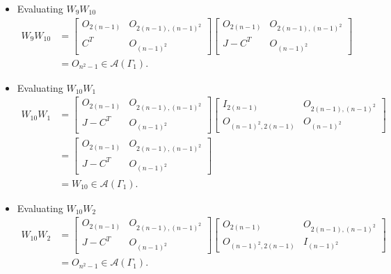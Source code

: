 \begin{itemize}
    \item Evaluating $W_9W_{10}$
    \begin{align*}
        W_9W_{10}
        &=\begin{bmatrix}
            O_{2(n-1)} & O_{2(n-1), (n-1)^2} \\
            C^T & O_{(n-1)^2}
        \end{bmatrix}\begin{bmatrix}
            O_{2(n-1)} & O_{2(n-1), (n-1)^2} \\
            J-C^T & O_{(n-1)^2}
        \end{bmatrix} \\
        &= O_{n^2-1}\in\mathcal{A}(\Gamma_1).
    \end{align*}
    
    \item Evaluating $W_{10}W_1$
    \begin{align*}
        W_{10}W_1
        &=\begin{bmatrix}
            O_{2(n-1)} & O_{2(n-1), (n-1)^2} \\
            J-C^T & O_{(n-1)^2}
        \end{bmatrix}\begin{bmatrix}
            I_{2(n-1)} & O_{2(n-1), (n-1)^2} \\
            O_{(n-1)^2, 2(n-1)} & O_{(n-1)^2}
        \end{bmatrix}\\
        &= \begin{bmatrix}
            O_{2(n-1)} & O_{2(n-1), (n-1)^2} \\
            J-C^T & O_{(n-1)^2}
        \end{bmatrix}\\
        &= W_{10}\in\mathcal{A}(\Gamma_1).
    \end{align*}
    
    \item Evaluating $W_{10}W_2$
    \begin{align*}
        W_{10}W_2
        &=\begin{bmatrix}
            O_{2(n-1)} & O_{2(n-1), (n-1)^2} \\
            J-C^T & O_{(n-1)^2}
        \end{bmatrix}\begin{bmatrix}
            O_{2(n-1)} & O_{2(n-1), (n-1)^2} \\
            O_{(n-1)^2, 2(n-1)} & I_{(n-1)^2}
        \end{bmatrix}\\
        &= O_{n^2-1}\in\mathcal{A}(\Gamma_1).
    \end{align*}
    

\end{itemize}
